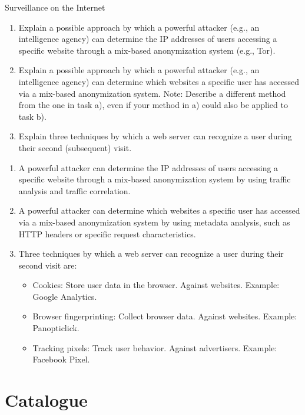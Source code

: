 \documentclass{article}
\begin{document}
\begin{exercise}{Surveillance on the Internet}
  \begin{enumerate}
    \item Explain a possible approach by which a powerful attacker (e.g., an intelligence agency) can determine the IP addresses of users accessing a specific website through a mix-based anonymization system (e.g., Tor).
    \item Explain a possible approach by which a powerful attacker (e.g., an intelligence agency) can determine which websites a specific user has accessed via a mix-based anonymization system. Note: Describe a different method from the one in task a), even if your method in a) could also be applied to task b).
    \item Explain three techniques by which a web server can recognize a user during their second (subsequent) visit.
  \end{enumerate}

  \begin{solution}
    \begin{enumerate}
      \item A powerful attacker can determine the IP addresses of users accessing a specific website through a mix-based anonymization system by using traffic analysis and traffic correlation.
      \item A powerful attacker can determine which websites a specific user has accessed via a mix-based anonymization system by using metadata analysis, such as HTTP headers or specific request characteristics.
      \item Three techniques by which a web server can recognize a user during their second visit are:
        \begin{itemize}
          \item Cookies: Store user data in the browser. Against websites. Example: Google Analytics.
          \item Browser fingerprinting: Collect browser data. Against websites. Example: Panopticlick.
          \item Tracking pixels: Track user behavior. Against advertisers. Example: Facebook Pixel.
        \end{itemize}
    \end{enumerate}
  \end{solution}
\end{exercise}

\section{Catalogue}
\end{document}

